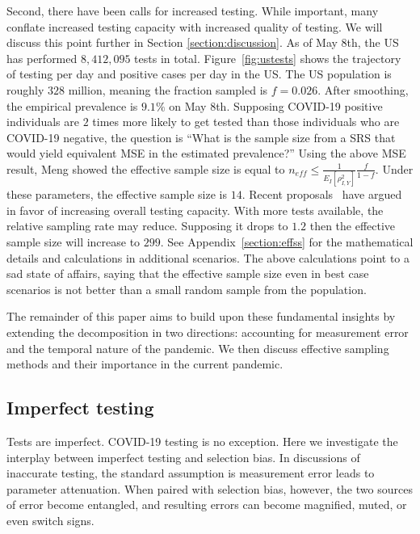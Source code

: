 \documentclass[aoas]{amsart}
\begin{document}
Second, there have been calls for increased testing.  While important, many conflate increased testing capacity with increased quality of testing.  We will discuss this point further in Section \ref{section:discussion}.  As of May 8th, the US has performed $8,412,095$ tests in total.  Figure~\ref{fig:ustests} shows the trajectory of testing per day and positive cases per day in the US.  The US population is roughly $328$ million, meaning the fraction sampled is $f = 0.026$.  After smoothing, the empirical prevalence is $9.1\%$ on May 8th.  Supposing COVID-19 positive individuals are $2$ times more likely to get tested than those individuals who are COVID-19 negative, the question is ``What is the sample size from a SRS that would yield equivalent MSE in the estimated prevalence?'' Using the above MSE result, Meng showed the effective sample size is equal to $n_{eff} \leq \frac{1}{E_I [ \rho_{I,Y}^2 ]} \frac{f}{1-f}$.  Under these parameters, the effective sample size is $14$.  Recent proposals~\citep{Siddarth2020} have argued in favor of increasing overall testing capacity.  With more tests available, the relative sampling rate may reduce.  Supposing it drops to $1.2$ then the effective sample size will increase to $299$.  See Appendix~\ref{section:effss} for the mathematical details and calculations in additional scenarios.   The above calculations point to a sad state of affairs, saying that the effective sample size even in best case scenarios is not better than a small random sample from the population.

The remainder of this paper aims to build upon these fundamental insights by extending the decomposition in two directions: accounting for  measurement error and the temporal nature of the pandemic.  We then discuss effective sampling methods and their importance in the current pandemic.

\subsection{Imperfect testing}

Tests are imperfect.  COVID-19 testing is no exception. Here we investigate the interplay between imperfect testing and selection bias.  In discussions of inaccurate testing, the standard assumption is measurement error leads to parameter attenuation.  When paired with selection bias, however, the two sources of error become entangled, and resulting errors can become magnified, muted, or even switch signs.
\end{document}
